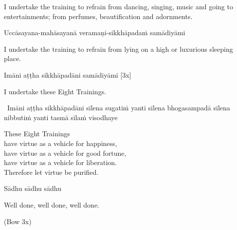 \begin{english-hang}
  I undertake the training to refrain from dancing, singing, music and going to entertainments; from perfumes, beautification and adornments.\makeatletter\hyperlink{endnote143-appendix}\makeatother
\end{english-hang}

Uccāsayana-mahāsayanā veramaṇi-sikkhāpadaṁ samādiyāmi

\begin{english-hang}
  I undertake the training to refrain from lying on a high or luxurious sleeping place.
\end{english-hang}

Imāni aṭṭha sikkhāpadāni samādiyāmi \hfill{[3x]}

\begin{english}
  I undertake these Eight Trainings.
\end{english}

\begin{leader-only}
  \anglebracketleft\ \hspace{-0.5mm}Imāni aṭṭha sikkhāpadāni sīlena sugatiṁ yanti sīlena bhogasampadā sīlena nibbutiṁ yanti tasmā sīlaṁ visodhaye \hspace{-0.5mm}\anglebracketright\
\end{leader-only}

\begin{english-verses}
  These Eight Trainings\\
  have virtue as a vehicle for happiness,\\
  have virtue as a vehicle for good fortune,\\
  have virtue as a vehicle for liberation.\\
  Therefore let virtue be purified.\makeatletter\hyperlink{endnote144-appendix}\makeatother
\end{english-verses}

Sādhu sādhu sādhu

\begin{english}
  Well done, well done, well done.
\end{english}

\begin{center}
  (Bow 3x)
\end{center}

\clearpage
